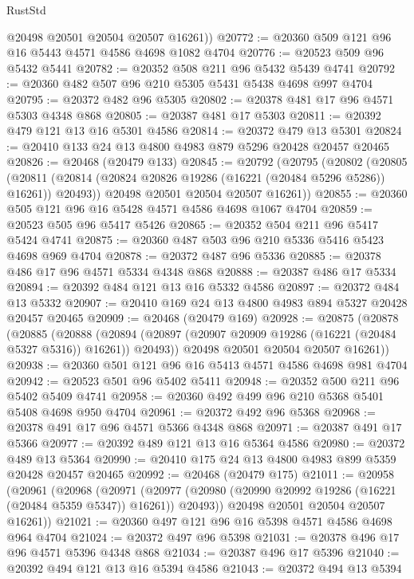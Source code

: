 \begin{lexlean}{RustStd}
\begin{coremodule}
        @20498
        @20501
        @20504
        @20507
        @16261))
@20772 := @20360 @509 @121 @96 @16 @5443 @4571 @4586 @4698 @1082 @4704
@20776 := @20523 @509 @96 @5432 @5441
@20782 := @20352 @508 @211 @96 @5432 @5439 @4741
@20792 := @20360 @482 @507 @96 @210 @5305 @5431 @5438 @4698 @997 @4704
@20795 := @20372 @482 @96 @5305
@20802 := @20378 @481 @17 @96 @4571 @5303 @4348 @868
@20805 := @20387 @481 @17 @5303
@20811 := @20392 @479 @121 @13 @16 @5301 @4586
@20814 := @20372 @479 @13 @5301
@20824 := @20410 @133 @24 @13 @4800 @4983 @879 @5296 @20428 @20457 @20465
@20826 := @20468 (@20479 @133)
@20845 := @20792
    (@20795
      (@20802
        (@20805
          (@20811 (@20814 (@20824 @20826 @19286 (@16221 (@20484 @5296 @5286)) @16261)) @20493))
        @20498
        @20501
        @20504
        @20507
        @16261))
@20855 := @20360 @505 @121 @96 @16 @5428 @4571 @4586 @4698 @1067 @4704
@20859 := @20523 @505 @96 @5417 @5426
@20865 := @20352 @504 @211 @96 @5417 @5424 @4741
@20875 := @20360 @487 @503 @96 @210 @5336 @5416 @5423 @4698 @969 @4704
@20878 := @20372 @487 @96 @5336
@20885 := @20378 @486 @17 @96 @4571 @5334 @4348 @868
@20888 := @20387 @486 @17 @5334
@20894 := @20392 @484 @121 @13 @16 @5332 @4586
@20897 := @20372 @484 @13 @5332
@20907 := @20410 @169 @24 @13 @4800 @4983 @894 @5327 @20428 @20457 @20465
@20909 := @20468 (@20479 @169)
@20928 := @20875
    (@20878
      (@20885
        (@20888
          (@20894 (@20897 (@20907 @20909 @19286 (@16221 (@20484 @5327 @5316)) @16261)) @20493))
        @20498
        @20501
        @20504
        @20507
        @16261))
@20938 := @20360 @501 @121 @96 @16 @5413 @4571 @4586 @4698 @981 @4704
@20942 := @20523 @501 @96 @5402 @5411
@20948 := @20352 @500 @211 @96 @5402 @5409 @4741
@20958 := @20360 @492 @499 @96 @210 @5368 @5401 @5408 @4698 @950 @4704
@20961 := @20372 @492 @96 @5368
@20968 := @20378 @491 @17 @96 @4571 @5366 @4348 @868
@20971 := @20387 @491 @17 @5366
@20977 := @20392 @489 @121 @13 @16 @5364 @4586
@20980 := @20372 @489 @13 @5364
@20990 := @20410 @175 @24 @13 @4800 @4983 @899 @5359 @20428 @20457 @20465
@20992 := @20468 (@20479 @175)
@21011 := @20958
    (@20961
      (@20968
        (@20971
          (@20977 (@20980 (@20990 @20992 @19286 (@16221 (@20484 @5359 @5347)) @16261)) @20493))
        @20498
        @20501
        @20504
        @20507
        @16261))
@21021 := @20360 @497 @121 @96 @16 @5398 @4571 @4586 @4698 @964 @4704
@21024 := @20372 @497 @96 @5398
@21031 := @20378 @496 @17 @96 @4571 @5396 @4348 @868
@21034 := @20387 @496 @17 @5396
@21040 := @20392 @494 @121 @13 @16 @5394 @4586
@21043 := @20372 @494 @13 @5394

\end{coremodule}
\end{lexlean}
